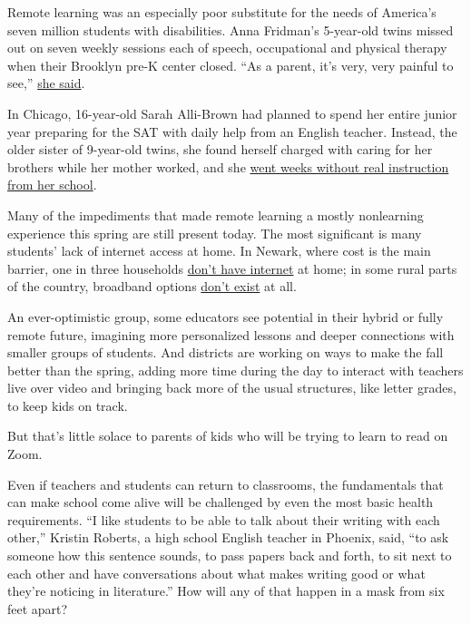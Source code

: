 Remote learning was an especially poor substitute for the needs of
America's seven million students with disabilities. Anna Fridman's
5-year-old twins missed out on seven weekly sessions each of speech,
occupational and physical therapy when their Brooklyn pre-K center
closed. ``As a parent, it's very, very painful to see,''
\href{https://ny.chalkbeat.org/2020/6/17/21295121/remote-learning-special-education-nyc}{she
said}.

In Chicago, 16-year-old Sarah Alli-Brown had planned to spend her entire
junior year preparing for the SAT with daily help from an English
teacher. Instead, the older sister of 9-year-old twins, she found
herself charged with caring for her brothers while her mother worked,
and she
\href{https://www.chalkbeat.org/2020/4/1/21225435/two-brothers-to-care-for-little-classwork-sat-worries-for-this-16-year-old-days-now-feel-like-weeks}{went
weeks without real instruction from her school}.

Many of the impediments that made remote learning a mostly nonlearning
experience this spring are still present today. The most significant is
many students' lack of internet access at home. In Newark, where cost is
the main barrier, one in three households
\href{https://newark.chalkbeat.org/2020/3/20/21196093/newark-students-will-get-laptops-free-internet-during-school-closure}{don't
have internet} at home; in some rural parts of the country, broadband
options
\href{https://in.chalkbeat.org/2020/5/28/21273890/how-the-politics-behind-rural-internet-access-leave-parts-of-indiana-in-the-dark-ages}{don't
exist} at all.

An ever-optimistic group, some educators see potential in their hybrid
or fully remote future, imagining more personalized lessons and deeper
connections with smaller groups of students. And districts are working
on ways to make the fall better than the spring, adding more time during
the day to interact with teachers live over video and bringing back more
of the usual structures, like letter grades, to keep kids on track.

But that's little solace to parents of kids who will be trying to learn
to read on Zoom.

Even if teachers and students can return to classrooms, the fundamentals
that can make school come alive will be challenged by even the most
basic health requirements. ``I like students to be able to talk about
their writing with each other,'' Kristin Roberts, a high school English
teacher in Phoenix, said, ``to ask someone how this sentence sounds, to
pass papers back and forth, to sit next to each other and have
conversations about what makes writing good or what they're noticing in
literature.'' How will any of that happen in a mask from six feet apart?

